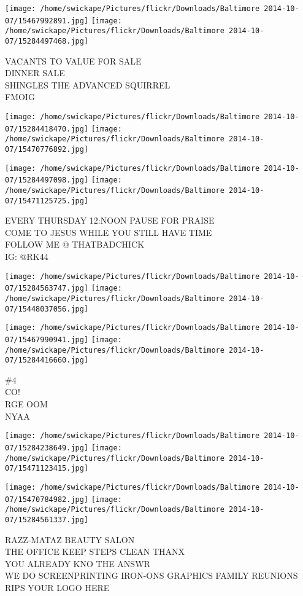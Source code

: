 \documentclass[10pt,letterpaper]{article}
\begin{document}
\texttt{[image: /home/swickape/Pictures/flickr/Downloads/Baltimore 2014-10-07/15467992891.jpg]}
\texttt{[image: /home/swickape/Pictures/flickr/Downloads/Baltimore 2014-10-07/15284497468.jpg]}

VACANTS TO VALUE FOR SALE\\
DINNER SALE\\
SHINGLES THE ADVANCED SQUIRREL\\
FMOIG
\pagebreak

\texttt{[image: /home/swickape/Pictures/flickr/Downloads/Baltimore 2014-10-07/15284418470.jpg]}
\texttt{[image: /home/swickape/Pictures/flickr/Downloads/Baltimore 2014-10-07/15470776892.jpg]}

\texttt{[image: /home/swickape/Pictures/flickr/Downloads/Baltimore 2014-10-07/15284497098.jpg]}
\texttt{[image: /home/swickape/Pictures/flickr/Downloads/Baltimore 2014-10-07/15471125725.jpg]}

EVERY THURSDAY 12:NOON PAUSE FOR PRAISE\\
COME TO JESUS WHILE YOU STILL HAVE TIME\\
FOLLOW ME @ THATBADCHICK\\
IG: @RK44
\pagebreak

\texttt{[image: /home/swickape/Pictures/flickr/Downloads/Baltimore 2014-10-07/15284563747.jpg]}
\texttt{[image: /home/swickape/Pictures/flickr/Downloads/Baltimore 2014-10-07/15448037056.jpg]}

\texttt{[image: /home/swickape/Pictures/flickr/Downloads/Baltimore 2014-10-07/15467990941.jpg]}
\texttt{[image: /home/swickape/Pictures/flickr/Downloads/Baltimore 2014-10-07/15284416660.jpg]}

\#4\\
CO!\\
RGE OOM\\
NYAA
\pagebreak

\texttt{[image: /home/swickape/Pictures/flickr/Downloads/Baltimore 2014-10-07/15284238649.jpg]}
\texttt{[image: /home/swickape/Pictures/flickr/Downloads/Baltimore 2014-10-07/15471123415.jpg]}

\texttt{[image: /home/swickape/Pictures/flickr/Downloads/Baltimore 2014-10-07/15470784982.jpg]}
\texttt{[image: /home/swickape/Pictures/flickr/Downloads/Baltimore 2014-10-07/15284561337.jpg]}

RAZZ{-}MATAZ BEAUTY SALON\\
THE OFFICE KEEP STEPS CLEAN THANX\\
YOU ALREADY KNO THE ANSWR\\
WE DO SCREENPRINTING IRON{-}ONS GRAPHICS FAMILY REUNIONS RIPS YOUR LOGO HERE
\pagebreak
\end{document}
